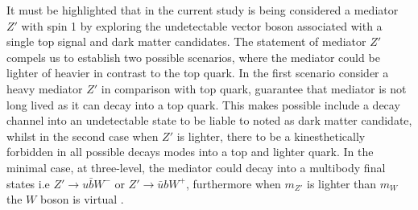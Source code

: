 It must be highlighted that in the current study is  being considered a mediator $Z'$ with spin 1 by exploring the undetectable vector boson associated with a single top signal and dark matter candidates. The statement of mediator $Z'$ compels us to establish two possible scenarios, where the mediator could be lighter of heavier in contrast to the top quark. In the first scenario consider a heavy mediator $Z'$ in comparison with top quark, guarantee that mediator is not long lived as it can decay into a top quark. This makes possible include a decay channel into an undetectable state to be liable to noted as dark matter candidate, whilst in the second case when $Z'$ is lighter, there to be a kinesthetically forbidden in all possible decays modes into a top and lighter quark. In the minimal case, at three-level, the mediator could decay into a multibody final states i.e $Z'\rightarrow u\bar{b}W^{-}$ or $Z'\rightarrow \bar{u}bW^{+}$, furthermore when $m_{Z'}$ is lighter than $m_{W}$ the $W$ boson is virtual \cite{324}.







\clearpage
